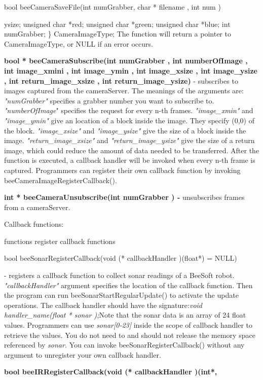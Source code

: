 {\begin{enumerate}{\bf
  \item bool beeCameraSaveFile(int numGrabber, char * filename , int
    num )}
  ysize; unsigned char *red; unsigned char *green; unsigned char
  *blue; int numGrabber; \} CameraImageType; The function will return
  a pointer to CameraImageType, or NULL if an error occurs.\item {\bf
    bool * beeCameraSubscribe(int numGrabber , int numberOfImage , int
    image\_xmini , int image\_ymin , int image\_xsize , int
    image\_ysize , int return\_image\_xsize , int
    return\_image\_ysize)} - subscribes to images captured from the
  cameraServer. The meanings of the arguments are: {\it "numGrabber"}
  specifies a grabber number you want to subscribe to. {\it
    "numberOfImage}" specifies the request for every n-th frames. {\it
    "image\_xmin"} and {\it "image\_ymin"} give an location of a block
  inside the image. They specify (0,0) of the block.{\it
    "image\_xsize"} and {\it "image\_ysize"} give the size of a block
  inside the image. {\it "return\_image\_xsize"} and {\it
    "return\_image\_ysize"} give the size of a return image, which
  could reduce the amount of data needed to be transferred.  After the
  function is executed, a callback handler will be invoked when every
  n-th frame is captured. Programmers can register their own callback
  function by invoking beeCameraImageRegisterCallback().\item {\bf int
    * beeCameraUnsubscribe(int numGrabber ) - }unsubscribes frames
  from a cameraServer. \end{enumerate}{\bf \par Callback
  functions: }functions register callback functions\par
\begin{enumerate}{\bf \item bool beeSonarRegisterCallback(void (*
    callbackHandler )(float*) = NULL)} - registers a callback function
  to collect sonar readings of a BeeSoft robot.  {\it
    "callbackHandler"} argument specifies the location of the callback
  function. Then the program can run beeSonarStartRegularUpdate() to
  activate the update operations. The callback handler should have the
  signature:{\it void handler\_name(float * sonar );}Note that the
  sonar data is an array of 24 float values. Programmers can use{\it
    sonar[0-23]} inside the scope of callback handler to retrieve the
  values. You do not need to and should not release the memory space
  referenced by {\it sonar. }You can invoke beeSonarRegisterCallback()
  without any argument to unregister your own callback handler.\item
  {\bf bool beeIRRegisterCallback(void (* callbackHandler )(int*,
}
\end{enumerate}}
